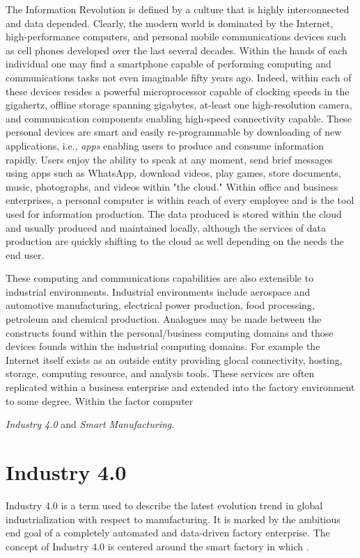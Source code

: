 \documentclass[english]{spimubphdthesis}
\begin{document}
The Information Revolution is defined by a culture that is highly interconnected and data depended.  Clearly, the modern world is dominated by the Internet, high-performance computers, and personal mobile communications devices such as cell phones developed over the last several decades. Within the hands of each individual one may find a smartphone capable of performing computing and communications tasks not even imaginable fifty years ago.  Indeed, within each of these devices resides a powerful microprocessor capable of clocking speeds in the gigahertz, offline storage spanning gigabytes, at-least one high-resolution camera, and communication components enabling high-speed connectivity capable.  These personal devices are smart and easily re-programmable by downloading of new applications, i.e., \textit{apps} enabling users to produce and consume information rapidly.  Users enjoy the ability to speak at any moment, send brief messages using apps such as WhatsApp\texttrademark, download videos, play games, store documents, music, photographs, and videos within "the cloud."  Within office and business enterprises, a personal computer is within reach of every employee and is the tool used for information production.  The data produced is stored within the cloud and usually produced and maintained locally, although the services of data production are quickly shifting to the cloud as well depending on the needs the end user.

These computing and communications capabilities are also extensible to industrial environments.  Industrial environments include aerospace and automotive manufacturing, electrical power production, food processing, petroleum and chemical production. Analogues may be made between the constructs found within the personal/business computing domains and those devices founds within the industrial computing domains.  For example the Internet itself exists as an outside entity providing glocal connectivity, hosting, storage, computing resource, and analysis tools.  These services are often replicated within a business enterprise and extended into the factory environment to some degree.  Within the factor computer

\textit{Industry 4.0} and \textit{Smart Manufacturing}.

\section{Industry 4.0}

Industry 4.0 is a term used to describe the latest evolution trend in global industrialization with respect to manufacturing.  It is marked by the ambitious end goal of a completely automated and data-driven factory enterprise.  The concept of Industry 4.0 is centered around the smart factory in which . 
\end{document}
